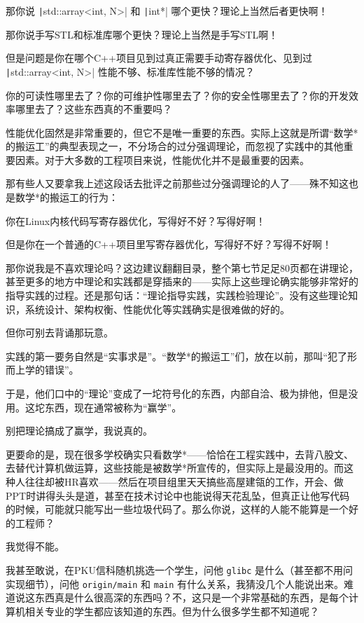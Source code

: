 那你说 \texttt|std::array<int, N>| 和 \texttt|int*| 哪个更快？理论上当然后者更快啊！

那你说手写STL和标准库哪个更快？理论上当然是手写STL啊！

但是问题是你在哪个C++项目见到过真正需要手动寄存器优化、见到过 \texttt|std::array<int, N>| 性能不够、标准库性能不够的情况？

你的可读性哪里去了？你的可维护性哪里去了？你的安全性哪里去了？你的开发效率哪里去了？这些东西真的不重要吗？

性能优化固然是非常重要的，但它不是唯一重要的东西。实际上这就是所谓“数学*的搬运工”的典型表现之一，不分场合的过分强调理论，而忽视了实践中的其他重要因素。对于大多数的工程项目来说，性能优化并不是最重要的因素。

那有些人又要拿我上述这段话去批评之前那些过分强调理论的人了——殊不知这也是数学*的搬运工的行为：

你在Linux内核代码写寄存器优化，写得好不好？写得好啊！

但是你在一个普通的C++项目里写寄存器优化，写得好不好？写得不好啊！

那你说我是不喜欢理论吗？这边建议翻翻目录，整个第七节足足80页都在讲理论，甚至更多的地方中理论和实践都是穿插来的——实际上这些理论确实能够非常好的指导实践的过程。还是那句话：“理论指导实践，实践检验理论”。没有这些理论知识，系统设计、架构权衡、性能优化等实践确实是很难做的好的。

但你可别去背诵那玩意。

实践的第一要务自然是“实事求是”。“数学*的搬运工”们，放在以前，那叫“犯了形而上学的错误”。

于是，他们口中的“理论”变成了一坨符号化的东西，内部自洽、极为排他，但是没用。这坨东西，现在通常被称为“赢学”。

别把理论搞成了赢学，我说真的。

更要命的是，现在很多学校确实只看数学*——恰恰在工程实践中，去背八股文、去替代计算机做运算，这些技能是被数学*所宣传的，但实际上是最没用的。而这种人往往却被HR喜欢——然后在项目组里天天搞些高屋建瓴的工作，开会、做PPT时讲得头头是道，甚至在技术讨论中也能说得天花乱坠，但真正让他写代码的时候，可能就只能写出一些垃圾代码了。那么你说，这样的人能不能算是一个好的工程师？

我觉得不能。

我甚至敢说，在PKU信科随机挑选一个学生，问他 \verb|glibc| 是什么（甚至都不用问实现细节），问他 \verb|origin/main| 和 \verb|main| 有什么关系，我猜没几个人能说出来。难道说这东西真是什么很高深的东西吗？不，这只是一个非常基础的东西，是每个计算机相关专业的学生都应该知道的东西。但为什么很多学生都不知道呢？

